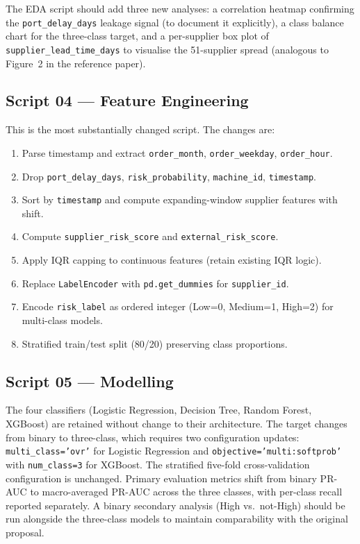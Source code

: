 \documentclass[11pt,a4paper]{article}
\begin{document}
The EDA script should add three new analyses: a correlation heatmap confirming the
\texttt{port\_delay\_days} leakage signal (to document it explicitly), a class
balance chart for the three-class target, and a per-supplier box plot of
\texttt{supplier\_lead\_time\_days} to visualise the 51-supplier spread (analogous to
Figure~2 in the reference paper).

\subsection{Script 04 --- Feature Engineering}

This is the most substantially changed script. The changes are:
\begin{enumerate}
  \item Parse timestamp and extract \texttt{order\_month}, \texttt{order\_weekday}, \texttt{order\_hour}.
  \item Drop \texttt{port\_delay\_days}, \texttt{risk\_probability}, \texttt{machine\_id}, \texttt{timestamp}.
  \item Sort by \texttt{timestamp} and compute expanding-window supplier features with shift.
  \item Compute \texttt{supplier\_risk\_score} and \texttt{external\_risk\_score}.
  \item Apply IQR capping to continuous features (retain existing IQR logic).
  \item Replace \texttt{LabelEncoder} with \texttt{pd.get\_dummies} for \texttt{supplier\_id}.
  \item Encode \texttt{risk\_label} as ordered integer (Low=0, Medium=1, High=2) for multi-class models.
  \item Stratified train/test split (80/20) preserving class proportions.
\end{enumerate}

\subsection{Script 05 --- Modelling}

The four classifiers (Logistic Regression, Decision Tree, Random Forest, XGBoost) are
retained without change to their architecture. The target changes from binary to
three-class, which requires two configuration updates: \texttt{multi\_class='ovr'} for
Logistic Regression and \texttt{objective='multi:softprob'} with
\texttt{num\_class=3} for XGBoost. The stratified five-fold cross-validation
configuration is unchanged. Primary evaluation metrics shift from binary PR-AUC to
macro-averaged PR-AUC across the three classes, with per-class recall reported
separately. A binary secondary analysis (High vs.\ not-High) should be run alongside
the three-class models to maintain comparability with the original proposal.
\end{document}
